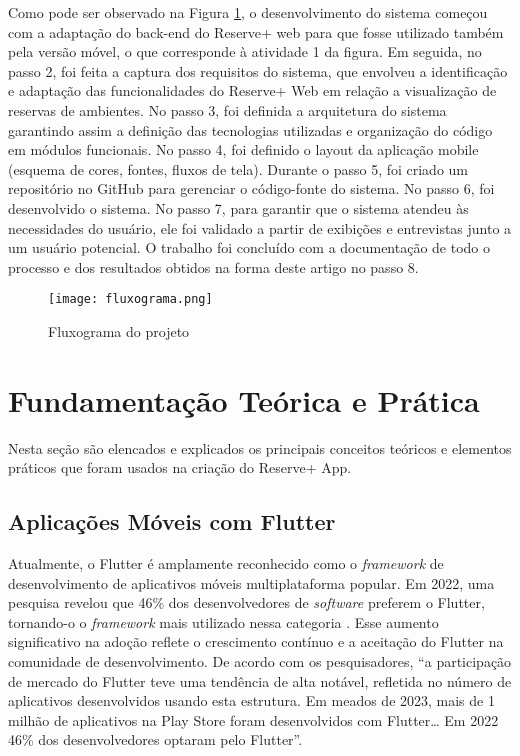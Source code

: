 \documentclass[12pt]{article}
\begin{document}
Como pode ser observado na Figura \ref{fig:flowchart}, o desenvolvimento do sistema começou com a adaptação do back-end do Reserve+ web para que fosse utilizado também pela versão móvel, o que corresponde à atividade 1 da figura. Em seguida, no passo 2, foi feita a captura dos requisitos do sistema, que envolveu a identificação e adaptação das funcionalidades do Reserve+ Web em relação a visualização de reservas de ambientes. No passo 3, foi definida a arquitetura do sistema garantindo assim a definição das tecnologias utilizadas e organização do código em módulos funcionais. No passo 4, foi definido o layout da aplicação mobile (esquema de cores, fontes, fluxos de tela). Durante o passo 5, foi criado um repositório no GitHub para gerenciar o código-fonte do sistema. No passo 6, foi desenvolvido o sistema. No passo 7, para garantir que o sistema atendeu às necessidades do usuário, ele foi validado a partir de exibições e entrevistas junto a um usuário potencial. O trabalho foi concluído com a documentação de todo o processo e dos resultados obtidos na forma deste artigo no passo 8.

\begin{figure}[!htb]
\centering
\texttt{[image: fluxograma.png]}
\caption{Fluxograma do projeto}
\label{fig:flowchart}
\end{figure}

\section{Fundamentação Teórica e Prática} \label{sec:theoretical-practical-foundation}

Nesta seção são elencados e explicados os principais conceitos teóricos e elementos práticos que foram usados na criação do Reserve+ App. 

\subsection{Aplicações Móveis com Flutter} \label{sec:mobile-applications-flutter}

Atualmente, o Flutter é amplamente reconhecido como o \textit{framework} de desenvolvimento de aplicativos móveis multiplataforma popular. Em 2022, uma pesquisa revelou que 46\% dos desenvolvedores de \textit{software} preferem o Flutter, tornando-o o \textit{framework} mais utilizado nessa categoria \cite{dawid}. Esse aumento significativo na adoção reflete o crescimento contínuo e a aceitação do Flutter na comunidade de desenvolvimento. De acordo com os pesquisadores, ``a participação de mercado do Flutter teve uma tendência de alta notável, refletida no número de aplicativos desenvolvidos usando esta estrutura. Em meados de 2023, mais de 1 milhão de aplicativos na Play Store foram desenvolvidos com Flutter… Em 2022 46\% dos desenvolvedores optaram pelo Flutter''.
\end{document}
